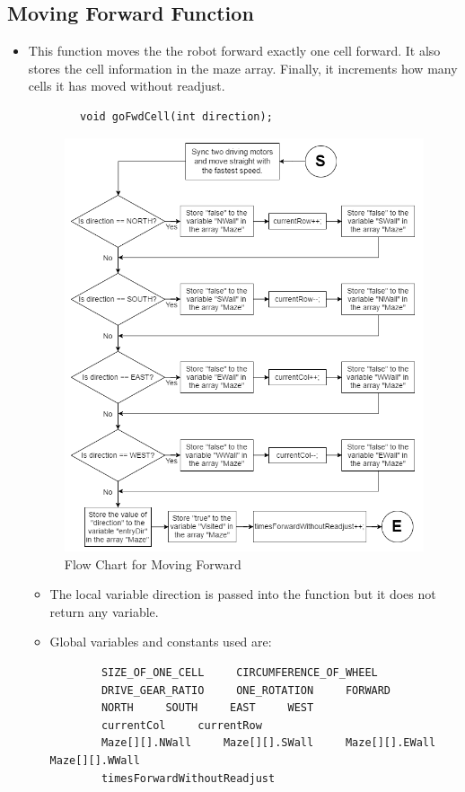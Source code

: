 \documentclass[11pt]{article}
\begin{document}

\subsection{Moving Forward Function}
\begin{itemize}
\item This function moves the the robot forward exactly one cell forward. It also stores the cell information in the maze array. Finally, it increments how many cells it has moved without readjust. 
	\begin{verbatim}
		void goFwdCell(int direction);
	\end{verbatim}
\begin{figure}[htp]
\centering
\includegraphics[scale=0.52]{images/Software_Flowchart/Moving_Forward.png}
\caption{Flow Chart for Moving Forward}
\label{}
\end{figure}	
	\begin{itemize}
	\item The local variable direction is passed into the function but it does not return any variable.
	\item Global variables and constants used are:
	\begin{verbatim}
		SIZE_OF_ONE_CELL     CIRCUMFERENCE_OF_WHEEL
		DRIVE_GEAR_RATIO     ONE_ROTATION     FORWARD
		NORTH     SOUTH     EAST     WEST
		currentCol     currentRow
		Maze[][].NWall     Maze[][].SWall     Maze[][].EWall     Maze[][].WWall
		timesForwardWithoutReadjust
	\end{verbatim}
	\end{itemize}
\end{itemize}
\newpage
\end{document}
